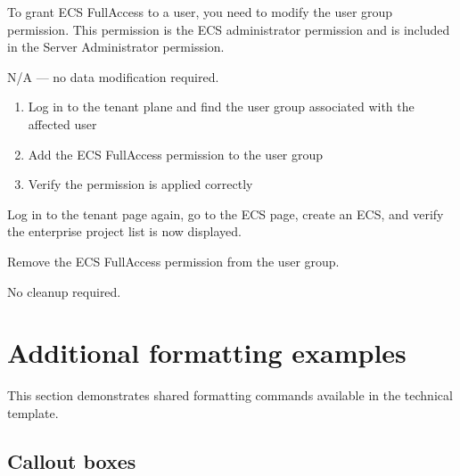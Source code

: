 \documentclass{technical}
\begin{document}
\begin{workaround}

  \begin{impact}
  To grant ECS FullAccess to a user, you need to modify the user group
  permission. This permission is the ECS administrator permission
  and is included in the Server Administrator permission.
  \end{impact}

  \begin{backupdata}
  N/A --- no data modification required.
  \end{backupdata}

  \begin{workaroundsteps}
  \begin{enumerate}
    \item Log in to the tenant plane and find the user group associated
      with the affected user
    \item Add the ECS FullAccess permission to the user group
    \item Verify the permission is applied correctly
  \end{enumerate}
  \end{workaroundsteps}

  \begin{verification}
  Log in to the tenant page again, go to the ECS page, create an
  ECS, and verify the enterprise project list is now displayed.
  \end{verification}

  \begin{rollback}
  Remove the ECS FullAccess permission from the user group.
  \end{rollback}

  \begin{cleanup}
  No cleanup required.
  \end{cleanup}

\end{workaround}

\section{Additional formatting examples}

This section demonstrates shared formatting commands available in the technical template.

\subsection{Callout boxes}
\end{document}
